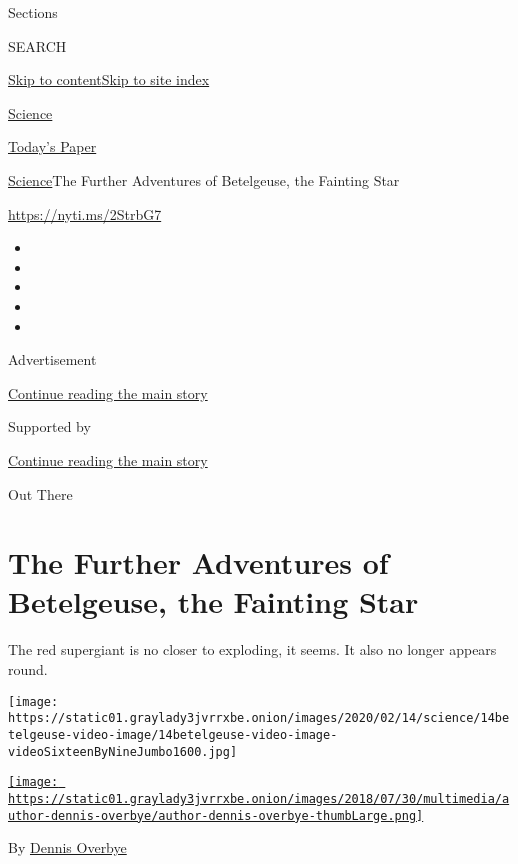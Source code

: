 Sections

SEARCH

\protect\hyperlink{site-content}{Skip to
content}\protect\hyperlink{site-index}{Skip to site index}

\href{https://www.nytimes3xbfgragh.onion/section/science}{Science}

\href{https://myaccount.nytimes3xbfgragh.onion/auth/login?response_type=cookie\&client_id=vi}{}

\href{https://www.nytimes3xbfgragh.onion/section/todayspaper}{Today's
Paper}

\href{/section/science}{Science}\textbar{}The Further Adventures of
Betelgeuse, the Fainting Star

\url{https://nyti.ms/2StrbG7}

\begin{itemize}
\item
\item
\item
\item
\item
\end{itemize}

Advertisement

\protect\hyperlink{after-top}{Continue reading the main story}

Supported by

\protect\hyperlink{after-sponsor}{Continue reading the main story}

Out There

\hypertarget{the-further-adventures-of-betelgeuse-the-fainting-star}{%
\section{The Further Adventures of Betelgeuse, the Fainting
Star}\label{the-further-adventures-of-betelgeuse-the-fainting-star}}

The red supergiant is no closer to exploding, it seems. It also no
longer appears round.

\texttt{[image: https://static01.graylady3jvrrxbe.onion/images/2020/02/14/science/14betelgeuse-video-image/14betelgeuse-video-image-videoSixteenByNineJumbo1600.jpg]}

\href{https://www.nytimes3xbfgragh.onion/by/dennis-overbye}{\texttt{[image: https://static01.graylady3jvrrxbe.onion/images/2018/07/30/multimedia/author-dennis-overbye/author-dennis-overbye-thumbLarge.png]}}

By \href{https://www.nytimes3xbfgragh.onion/by/dennis-overbye}{Dennis
Overbye}

